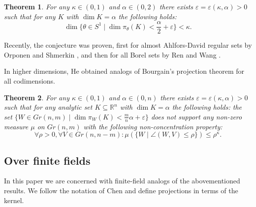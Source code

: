 \documentclass{amsart}
\newtheorem{theorem}{Theorem}[section]
\newcommand{\R}{\mathbb R}
\begin{document}
\begin{theorem}\label{BourgainProjectionTheorem}
    For any $\kappa \in (0, 1)$ and $\alpha \in (0, 2)$ there exists $\varepsilon = \varepsilon(\kappa, \alpha) > 0$ such that for any $K$ with $\dim K = \alpha$ the following holds:
    $$\dim \{\theta \in S^1 \mid \dim \pi_\theta(K) < \frac{\alpha}{2} + \varepsilon\} < \kappa.$$ 
\end{theorem}

Recently, the conjecture was proven, first for almost Ahlfors-David regular sets by Orponen and Shmerkin \cite{Orp23}, and then for all Borel sets by Ren and Wang \cite{Ren23}.

In higher dimensions, He \cite{He18} obtained analogs of Bourgain's projection theorem for all codimensions.

\begin{theorem}\label{higherBourgainProjection}
    For any $\kappa \in (0, 1)$ and $\alpha \in (0, n)$ there exists $\varepsilon = \varepsilon(\kappa, \alpha) > 0$ such that for any analytic set $K \subseteq \R^n$ with $\dim K = \alpha$ the following holds:
    the set $\{W \in Gr(n, m) \mid \dim \pi_W(K) < \frac{m}{n}\alpha + \varepsilon\}$ does not support any non-zero measure $\mu$ on $Gr(n, m)$ with the following non-concentration property:
    $$\forall \rho > 0, \forall V \in Gr(n, n - m):  \mu(\{W \mid \angle(W, V) \leq \rho \}) \leq \rho^\kappa.$$
\end{theorem}

\subsection{Over finite fields}
In this paper we are concerned with finite-field analogs of the abovementioned results. We follow the notation of Chen \cite{Che17} and define projections in terms of the kernel.
\end{document}
